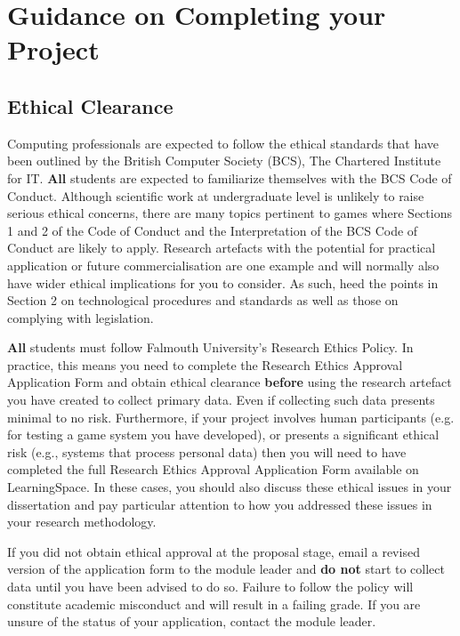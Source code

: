 \chapter{Guidance on Completing your Project}

\section*{Ethical Clearance}

Computing professionals are expected to follow the ethical standards that have been outlined by the British Computer Society (BCS), The Chartered Institute for IT. \textbf{All} students are expected to familiarize themselves with the BCS Code of Conduct. Although scientific work at undergraduate level is unlikely to raise serious ethical concerns, there are many topics pertinent to games where Sections 1 and 2 of the Code of Conduct and the Interpretation of the BCS Code of Conduct are likely to apply. Research artefacts with the potential for practical application or future commercialisation are one example and will normally also have wider ethical implications for you to consider. As such, heed the points in Section 2 on technological procedures and standards as well as those on complying with legislation.

\textbf{All} students must follow Falmouth University's Research Ethics Policy. In practice, this means you need to complete the Research Ethics Approval Application Form and obtain ethical clearance \textbf{before} using the research artefact you have created to collect primary data. Even if collecting such data presents minimal to no risk. Furthermore, if your project involves human participants (e.g. for testing a game system you have developed), or presents a significant ethical risk (e.g., systems that process personal data) then you will need to have completed the full Research Ethics Approval Application Form available on LearningSpace. In these cases, you should also discuss these ethical issues in your dissertation and pay particular attention to how you addressed these issues in your research methodology.

If you did not obtain ethical approval at the proposal stage, email a revised version of the application form to the module leader and \textbf{do not} start to collect data until you have been advised to do so. Failure to follow the policy will constitute academic misconduct and will result in a failing grade. If you are unsure of the status of your application, contact the module leader.

